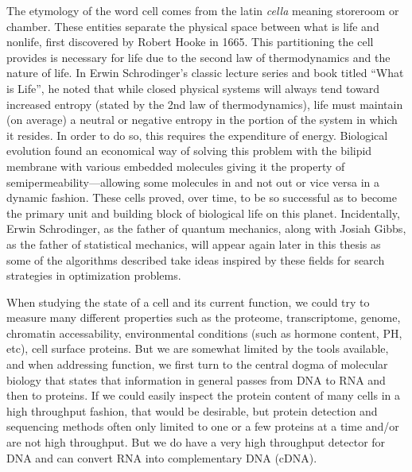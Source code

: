 \par{
The etymology of the word cell comes from the latin \textit{cella} meaning storeroom or chamber. These entities separate the physical space between what is life and nonlife, first discovered by Robert Hooke in 1665\cite{Hooke}. This partitioning the cell provides is necessary for life due to the second law of thermodynamics and the nature of life. In Erwin Schrodinger's classic lecture series and book titled ``What is Life''\cite{whatislife}, he noted that while closed physical systems will always tend toward increased entropy (stated by the 2nd law of thermodynamics\cite{thermodynamics1}\cite{thermodynamics2}\cite{maxwell}), life must maintain (on average) a neutral or negative entropy in the portion of the system in which it resides\cite{informationtheorylife}\cite{astrobiology}\cite{extremalities}. In order to do so, this requires the expenditure of energy. Biological evolution found an economical way of solving this problem with the bilipid membrane with various embedded molecules giving it the property of semipermeability---allowing some molecules in and not out or vice versa in a dynamic fashion. These cells proved, over time, to be so successful as to become the primary unit and building block of biological life on this planet. Incidentally, Erwin Schrodinger, as the father of quantum mechanics, along with Josiah Gibbs, as the father of statistical mechanics, will appear again later in this thesis as some of the algorithms described take ideas inspired by these fields for search strategies in optimization problems.
} \\

\par{
When studying the state of a cell and its current function, we could try to measure many different properties such as the proteome, transcriptome, genome, chromatin accessability, environmental conditions (such as hormone content, PH, etc), cell surface proteins. But we are somewhat limited by the tools available, and when addressing function, we first turn to the central dogma of molecular biology\cite{centraldogma} that states that information in general passes from DNA to RNA and then to proteins. If we could easily inspect the protein content of many cells in a high throughput fashion, that would be desirable, but protein detection and sequencing methods often only limited to one or a few proteins at a time and/or are not high throughput\cite{immunohistochemistry}\cite{multiIHC}\cite{westernblot}\cite{western2}\cite{multimassspec}\cite{ionbeam}\cite{cellIHC}\cite{proteinsequencing}. But we do have a very high throughput detector for DNA and can convert RNA into complementary DNA (cDNA).
}

